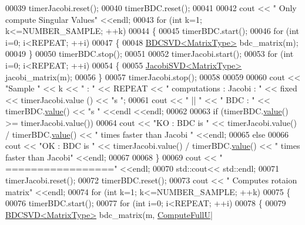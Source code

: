 \begin{DoxyCode}
00039   timerJacobi.reset();
00040   timerBDC.reset();
00041 
00042   cout << \textcolor{stringliteral}{" Only compute Singular Values"} <<endl;
00043   \textcolor{keywordflow}{for} (\textcolor{keywordtype}{int} k=1; k<=NUMBER\_SAMPLE; ++k)
00044   \{
00045     timerBDC.start();
00046     \textcolor{keywordflow}{for} (\textcolor{keywordtype}{int} i=0; i<REPEAT; ++i) 
00047     \{
00048       \hyperlink{group___s_v_d___module_class_eigen_1_1_b_d_c_s_v_d}{BDCSVD<MatrixType>} bdc\_matrix(m);
00049     \}
00050     timerBDC.stop();
00051     
00052     timerJacobi.start();
00053     \textcolor{keywordflow}{for} (\textcolor{keywordtype}{int} i=0; i<REPEAT; ++i) 
00054     \{
00055       \hyperlink{group___s_v_d___module_class_eigen_1_1_jacobi_s_v_d}{JacobiSVD<MatrixType>} jacobi\_matrix(m);
00056     \}
00057     timerJacobi.stop();
00058 
00059 
00060     cout << \textcolor{stringliteral}{"Sample "} << k << \textcolor{stringliteral}{" : "} << REPEAT << \textcolor{stringliteral}{" computations :  Jacobi : "} << fixed << timerJacobi.value
      () << \textcolor{stringliteral}{"s "};
00061     cout << \textcolor{stringliteral}{" || "} << \textcolor{stringliteral}{" BDC : "} << timerBDC.\hyperlink{class_eigen_1_1_bench_timer_a26760f963ed8b64c126159bfea57735e}{value}() << \textcolor{stringliteral}{"s "} <<endl <<endl;
00062       
00063     \textcolor{keywordflow}{if} (timerBDC.\hyperlink{class_eigen_1_1_bench_timer_a26760f963ed8b64c126159bfea57735e}{value}() >= timerJacobi.value())  
00064       cout << \textcolor{stringliteral}{"KO : BDC is "} <<  timerJacobi.value() / timerBDC.\hyperlink{class_eigen_1_1_bench_timer_a26760f963ed8b64c126159bfea57735e}{value}() << \textcolor{stringliteral}{"  times faster than Jacobi
      "} <<endl;
00065     \textcolor{keywordflow}{else} 
00066       cout << \textcolor{stringliteral}{"OK : BDC is "} << timerJacobi.value() / timerBDC.\hyperlink{class_eigen_1_1_bench_timer_a26760f963ed8b64c126159bfea57735e}{value}() << \textcolor{stringliteral}{"  times faster than Jacobi"}
        <<endl;
00067       
00068   \}
00069   cout << \textcolor{stringliteral}{"       ================="} <<endl;
00070   std::cout<< std::endl;
00071   timerJacobi.reset();
00072   timerBDC.reset();
00073   cout << \textcolor{stringliteral}{" Computes rotaion matrix"} <<endl;
00074   \textcolor{keywordflow}{for} (\textcolor{keywordtype}{int} k=1; k<=NUMBER\_SAMPLE; ++k)
00075   \{
00076     timerBDC.start();
00077     \textcolor{keywordflow}{for} (\textcolor{keywordtype}{int} i=0; i<REPEAT; ++i) 
00078     \{
00079       \hyperlink{group___s_v_d___module_class_eigen_1_1_b_d_c_s_v_d}{BDCSVD<MatrixType>} bdc\_matrix(m, \hyperlink{group__enums_ggae3e239fb70022eb8747994cf5d68b4a9a2b4f91ca5859a4159dbfe8090043817f}{ComputeFullU}|

\end{DoxyCode}
